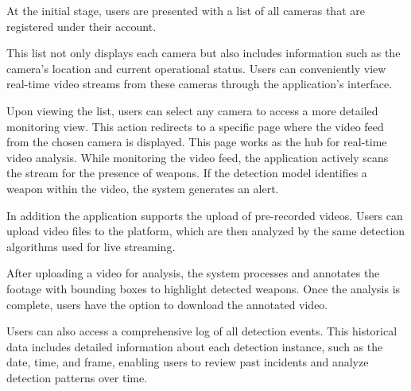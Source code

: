 At the initial stage, users are presented with a list of all cameras that are registered under their account. 

This list not only displays each camera but also includes information such as the camera's location and current operational
status. Users can conveniently view real-time video streams from these cameras through the application's interface.

Upon viewing the list, users can select any camera to access a more detailed monitoring view. This action 
redirects to a specific page where the video feed from the chosen camera is displayed. This page works 
as the hub for real-time video analysis. While monitoring the video feed, the application actively scans the stream 
for the presence of weapons. If the detection model identifies a weapon within the video, the system generates an alert.

In addition the application supports the upload of pre-recorded videos. Users can upload video files to the platform, which 
are then analyzed by the same detection algorithms used for live streaming.

After uploading a video for analysis, the system processes and annotates the footage with bounding boxes to 
highlight detected weapons. Once the analysis is complete, users have the option to download the annotated video.

Users can also access a comprehensive log of all detection events. This historical data includes detailed information 
about each detection instance, such as the date, time, and frame, enabling users to review past incidents and 
analyze detection patterns over time.

